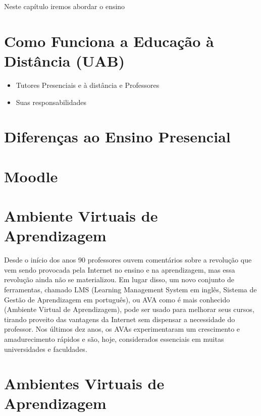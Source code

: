 Neste capítulo iremos abordar o ensino 

\section{Como Funciona a Educação à Distância (UAB)}

\begin{itemize}
 \item Tutores Presenciais e à distância e Professores
 \item Suas responsabilidades
\end{itemize}

\section{Diferenças ao Ensino Presencial}

\section{Moodle}


\section{Ambiente Virtuais de Aprendizagem}

Desde o início dos anos 90 professores ouvem comentários sobre a revolução que vem sendo provocada pela Internet no ensino e na aprendizagem, mas essa revolução ainda não se materializou. Em lugar disso, um novo conjunto de ferramentas, chamado LMS (Learning Management System em inglês, Sistema de Gestão de Aprendizagem em português), ou AVA como é mais conhecido (Ambiente Virtual de Aprendizagem), pode ser usado para melhorar seus cursos, tirando proveito das vantagens da Internet sem dispensar a necessidade do professor. Nos últimos dez anos, os AVAs experimentaram um crescimento e amadurecimento rápidos e são, hoje, considerados essenciais em muitas universidades e faculdades.


\section{Ambientes Virtuais de Aprendizagem}

